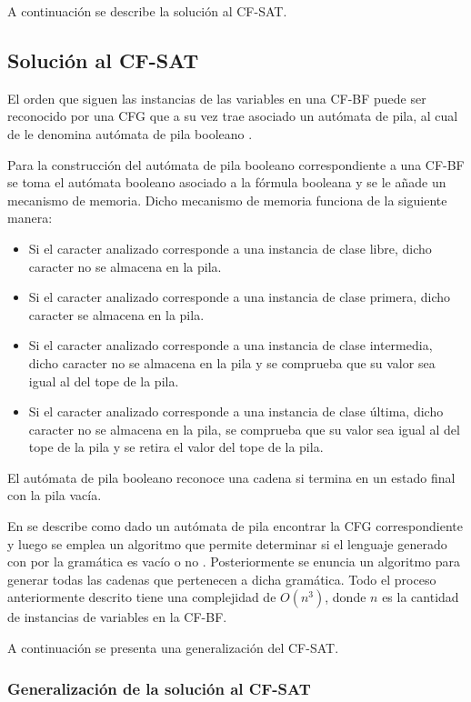 \documentclass[12pt]{article}
\begin{document}
A continuación se describe la solución al CF-SAT.

\subsection{Solución al CF-SAT}

El orden que siguen las instancias de las variables en una CF-BF puede ser reconocido por una CFG que a su vez trae asociado
un autómata de pila, al cual de le denomina autómata de pila booleano \cite{aCFSAT}.

Para la construcción del autómata de pila booleano correspondiente a una CF-BF se toma el autómata booleano asociado
a la fórmula booleana y se le añade un mecanismo de memoria. Dicho mecanismo de memoria funciona de la siguiente manera:

\begin{itemize}
      \item Si el caracter analizado corresponde a una instancia de clase libre, dicho caracter no se almacena en la pila.
      \item Si el caracter analizado corresponde a una instancia de clase primera, dicho caracter se almacena en la pila.
      \item Si el caracter analizado corresponde a una instancia de clase intermedia, dicho caracter no se almacena en la
            pila y se comprueba que su valor sea igual al del tope de la pila.
      \item Si el caracter analizado corresponde a una instancia de clase última, dicho caracter no se almacena en la
            pila, se comprueba que su valor sea igual al del tope de la pila y se retira el valor del tope de la pila.
\end{itemize}
El autómata de pila booleano reconoce una cadena si termina en un estado final con la pila vacía.

En \cite{aCFSAT} se describe como dado un autómata de pila encontrar la CFG correspondiente y luego 
se emplea un algoritmo que permite determinar si el lenguaje generado con por la gramática es vacío o no \cite{authomataTheory}. Posteriormente 
se enuncia un algoritmo para generar todas las cadenas que pertenecen a dicha gramática. Todo el proceso anteriormente descrito tiene una complejidad de $O(n^3)$, donde $n$
es la cantidad de instancias de variables en la CF-BF.

A continuación se presenta una generalización del CF-SAT.

\subsubsection{Generalización de la solución al CF-SAT}
\end{document}
